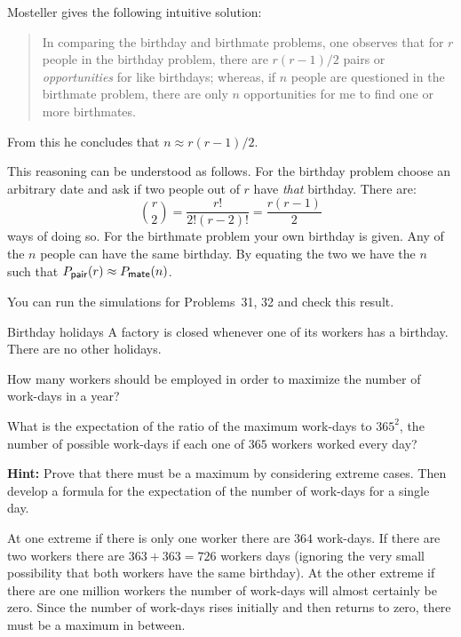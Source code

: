 
Mosteller \cite[p.~322]{birthday} gives the following intuitive solution:
\begin{quote}
In comparing the birthday and birthmate problems, one observes that for $r$ people in the birthday problem, there are $r(r-1)/2$ pairs or \emph{opportunities} for like birthdays; whereas, if $n$ people are questioned in the birthmate problem, there are only $n$ opportunities for me to find one or more birthmates.
\end{quote}
From this he concludes that $n\approx r(r-1)/2$.

This reasoning can be understood as follows. For the birthday problem choose an arbitrary date and ask if two people out of $r$ have \emph{that} birthday. There are:
\[
{r \choose 2}=\frac{r!}{2!(r-2)!} = \frac{r(r-1)}{2}
\]
ways of doing so. For the birthmate problem your own birthday is given. Any of the $n$ people can have the same birthday. By equating the two we have the $n$ such that $P_{\textsf{\footnotesize pair}}(r) \approx P_{\textsf{\footnotesize mate}}(n)$.

You can run the simulations for Problems~31, 32 and check this result.


\begin{prob}{Birthday holidays}
A factory is closed whenever one of its workers has a birthday. There are no other holidays.

 How many workers should be employed in order to maximize the number of work-days in a year?

 What is the expectation of the ratio of the maximum work-days to $365^2$, the number of possible work-days if each one of $365$ workers worked every day?

\textbf{Hint:} Prove that there must be a maximum by considering extreme cases. Then develop a formula for the expectation of the number of work-days for a single day.
\end{prob}

\solution{}

At one extreme if there is only one worker there are $364$ work-days. If there are two workers there are $363+363=726$ workers days (ignoring the very small possibility that both workers have the same birthday). At the other extreme if there are one million workers the number of work-days will almost certainly be zero. Since the number of work-days rises initially and then returns to zero, there must be a maximum in between.

